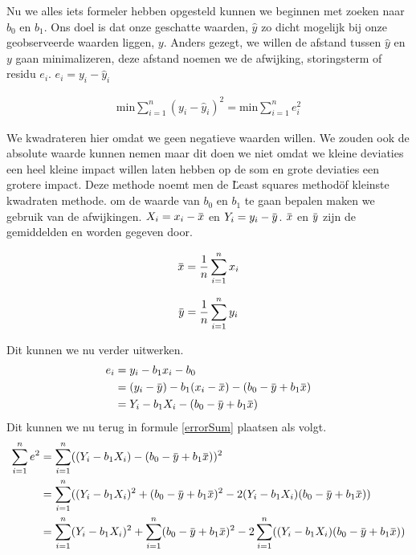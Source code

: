 \documentclass[11pt]{report}
\newcommand{\overbar}[1]{\mkern 1.5mu\overline{\mkern-1.5mu#1\mkern-1.5mu}\mkern 1.5mu}
\newcommand{\pbr}{\hfill\break\hfill\break}
\newcommand{\lbr}{\hfill\break}
\begin{document}
Nu we alles iets formeler hebben opgesteld kunnen we beginnen met zoeken naar $b_0$ en $b_1$. Ons doel is dat onze geschatte waarden, $\hat{y}$ zo dicht mogelijk bij onze geobserveerde waarden liggen, $y$. Anders gezegt, we willen de afstand tussen $\hat{y}$ en $y$ gaan minimalizeren, deze afstand noemen we de afwijking, storingsterm of residu $e_i$. $e_i = y_i -\hat{y}_i$
\begin{ceqn}
  \begin{align}
    \text{min} \sum_{i=1}^n(y_i - \hat{y}_i)^2 = \text{min} \sum_{i=1}^ne_i^2
    \label{errorSum}
  \end{align}
\end{ceqn}
We kwadrateren hier omdat we geen negatieve waarden willen. We zouden ook de absolute waarde kunnen nemen maar dit doen we niet omdat we kleine deviaties een heel kleine impact willen laten hebben op de som en grote deviaties een grotere impact. Deze methode noemt men de \"Least squares method\" of kleinste kwadraten methode.
\pbr
om de waarde van $b_0$ en $b_1$ te gaan bepalen maken we gebruik van de afwijkingen.\lbr
$X_i = x_i - \overbar{x}$ en $Y_i = y_i - \overbar{y}$. $\overbar{x}$ en $\overbar{y}$ zijn de gemiddelden en worden gegeven door.\lbr
\noindent\begin{minipage}{.5\linewidth}
  \begin{equation*}
    \overbar{x} = \frac{1}{n}\sum_{i=1}^{n}x_i
  \end{equation*}
\end{minipage}%
\begin{minipage}{.5\linewidth}
  \begin{equation*}
    \overbar{y} = \frac{1}{n}\sum_{i=1}^{n}y_i
  \end{equation*}
\end{minipage}
Dit kunnen we nu verder uitwerken.
\begin{equation*}
  \begin{split}
    e_i &= y_i - b_1x_i - b_0\\
    &= (y_i - \overbar{y}) - b_1(x_i - \overbar{x})-(b_0 - \overbar{y} + b_1\overbar{x})\\
    &= Y_i - b_1X_i - (b_0 - \overbar{y} + b_1\overbar{x})
  \end{split}
\end{equation*}
Dit kunnen we nu terug in formule \ref{errorSum} plaatsen als volgt.
\begin{equation*}
  \begin{split}
    \sum_{i=1}^{n}e^2 &= \sum_{i=1}^n((Y_i - b_1X_i)-(b_0 - \overbar{y} + b_1\overbar{x}))^2\\
    &= \sum_{i=1}^n((Y_i - b_1X_i)^2 + (b_0 - \overbar{y} + b_1\overbar{x})^2 - 2(Y_i - b_1X_i)(b_0 - \overbar{y} + b_1\overbar{x}))\\
    &= \sum_{i=1}^n(Y_i - b_1X_i)^2 + \sum_{i=1}^n(b_0 - \overbar{y} + b_1\overbar{x})^2 - 2\sum_{i=1}^n((Y_i - b_1X_i)(b_0 - \overbar{y} + b_1\overbar{x}))\\
  \end{split}
\end{equation*}
\end{document}
